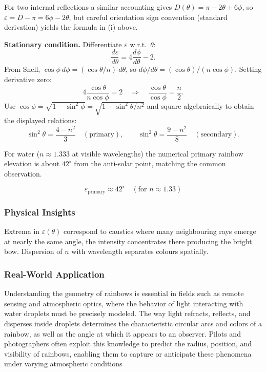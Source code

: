 \documentclass[12pt,a4paper]{article}
\newcommand{\bluebox}[1]{\begin{tcolorbox}#1\end{tcolorbox}}
\begin{document}
For two internal reflections a similar accounting gives $D(\theta)=\pi-2\theta+6\phi$, so $\varepsilon=D-\pi=6\phi-2\theta$, but careful orientation sign convention (standard derivation) yields the formula in (i) above.

\textbf{Stationary condition.} Differentiate $\varepsilon$ w.r.t.\ $\theta$:
\[
\frac{d\varepsilon}{d\theta}=4\frac{d\phi}{d\theta}-2.
\]
From Snell, $\cos\phi\ d\phi=(\cos\theta/n)\ d\theta$, so $d\phi/d\theta=(\cos\theta)/(n\cos\phi)$. Setting derivative zero:
\[
4\frac{\cos\theta}{n\cos\phi}=2\quad\Rightarrow\quad
\frac{\cos\theta}{\cos\phi}=\frac{n}{2}.
\]
Use $\cos\phi=\sqrt{1-\sin^2\phi}=\sqrt{1-\sin^2\theta/n^2}$ and square algebraically to obtain the displayed relations:
\[
\sin^2\theta=\frac{4-n^2}{3}\quad(\text{primary}),\qquad
\sin^2\theta=\frac{9-n^2}{8}\quad(\text{secondary}).
\]

For water ($n\approx1.333$ at visible wavelengths) the numerical primary rainbow elevation is about $42^\circ$ from the anti-solar point, matching the common observation.

\bluebox{\[
\varepsilon_{\text{primary}}\approx 42^\circ\quad(\text{for }n\approx1.33)
\]}

\subsubsection*{Physical Insights}
Extrema in $\varepsilon(\theta)$ correspond to caustics where many neighbouring rays emerge at nearly the same angle, the intensity concentrates there producing the bright bow. Dispersion of $n$ with wavelength separates colours spatially.

\subsubsection*{Real-World Application}
Understanding the geometry of rainbows is essential in fields such as remote sensing and atmospheric optics, where the behavior of light interacting with water droplets must be precisely modeled. The way light refracts, reflects, and disperses inside droplets determines the characteristic circular arcs and colors of a rainbow, as well as the angle at which it appears to an observer. Pilots and photographers often exploit this knowledge to predict the radius, position, and visibility of rainbows, enabling them to capture or anticipate these phenomena under varying atmospheric conditions


\newpage
\end{document}
